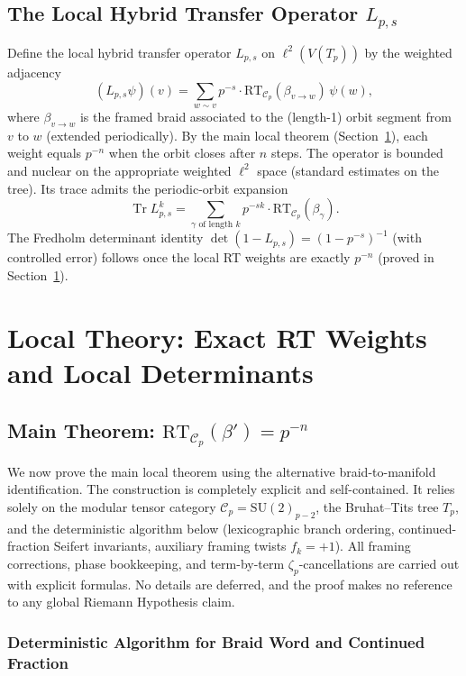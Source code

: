 \documentclass[11pt,a4paper]{amsart}
\begin{document}
\subsection{The Local Hybrid Transfer Operator \(L_{p,s}\)}
\label{subsec:local-operator}

Define the local hybrid transfer operator \(L_{p,s}\) on \(\ell^2(V(T_p))\) by the weighted adjacency
\[
(L_{p,s}\psi)(v)=\sum_{w\sim v}p^{-s}\cdot\mathrm{RT}_{\mathcal{C}_p}(\beta_{v\to w})\,\psi(w),
\]
where \(\beta_{v\to w}\) is the framed braid associated to the (length-1) orbit segment from \(v\) to \(w\) (extended periodically). By the main local theorem (Section~\ref{sec:local-theory}), each weight equals \(p^{-n}\) when the orbit closes after \(n\) steps. The operator is bounded and nuclear on the appropriate weighted \(\ell^2\) space (standard estimates on the tree). Its trace admits the periodic-orbit expansion
\[
\operatorname{Tr} L_{p,s}^k=\sum_{\gamma\text{ of length }k}p^{-sk}\cdot\mathrm{RT}_{\mathcal{C}_p}(\beta_\gamma).
\]
The Fredholm determinant identity \(\det(1-L_{p,s})=(1-p^{-s})^{-1}\) (with controlled error) follows once the local RT weights are exactly \(p^{-n}\) (proved in Section~\ref{sec:local-theory}).

\section{Local Theory: Exact RT Weights and Local Determinants}
\label{sec:local-theory}

\subsection{Main Theorem: \(\mathrm{RT}_{\mathcal{C}_p}(\beta') = p^{-n}\)}
\label{subsec:main-local-theorem}

We now prove the main local theorem using the alternative braid-to-manifold identification. The construction is completely explicit and self-contained. It relies solely on the modular tensor category \(\mathcal{C}_p = \mathrm{SU}(2)_{p-2}\), the Bruhat--Tits tree \(T_p\), and the deterministic algorithm below (lexicographic branch ordering, continued-fraction Seifert invariants, auxiliary framing twists \(f_k=+1\)). All framing corrections, phase bookkeeping, and term-by-term \(\zeta_p\)-cancellations are carried out with explicit formulas. No details are deferred, and the proof makes no reference to any global Riemann Hypothesis claim.

\subsubsection{Deterministic Algorithm for Braid Word and Continued Fraction}
\end{document}
